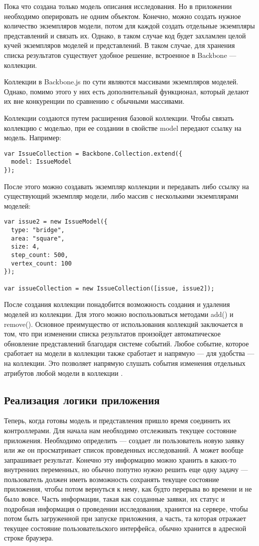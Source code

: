 Пока что создана только модель описания исследования. Но в приложении необходимо оперировать не одним объектом. Конечно, можно создать нужное количество экземпляров модели, потом для каждой создать отдельные экземпляры представлений и связать их. Однако, в таком случае код будет захламлен целой кучей экземпляров моделей и представлений. В таком случае, для хранения списка результатов существует удобное решение, встроенное в Backbone --- коллекции.

Коллекции в Backbone.js по сути являются массивами экземпляров моделей. Однако, помимо этого у них есть дополнительный функционал, который делают их вне конкуренции по сравнению с обычными массивами.

Коллекции создаются путем расширения базовой коллекции. Чтобы связать коллекцию с моделью, при ее создании в свойстве model передают ссылку на модель. Например:
\begin{lstlisting}
var IssueCollection = Backbone.Collection.extend({
  model: IssueModel
});
\end{lstlisting}
После этого можно создавать экземпляр коллекции и передавать либо ссылку на существующий экземпляр модели, либо массив с несколькими экземплярами моделей:
\begin{lstlisting}
var issue2 = new IssueModel({
  type: "bridge",
  area: "square",
  size: 4,
  step_count: 500,
  vertex_count: 100
});

var issueCollection = new IssueCollection([issue, issue2]);
\end{lstlisting}
После создания коллекции понадобится возможность создания и удаления моделей из коллекции. Для этого можно воспользоваться методами add() и remove(). Основное преимущество от использования коллекций заключается в том, что при изменении списка результатов произойдет автоматическое обновление представлений благодаря системе событий. Любое событие, которое сработает на модели в коллекции также сработает и напрямую --- для удобства --- на коллекции. Это позволяет напрямую слушать события изменения отдельных атрибутов любой модели в коллекции \cite{backbone}.

\subsection{Реализация логики приложения}

Теперь, когда готовы модель и представления пришло время соединить их контроллерами. Для начала нам необходимо отслеживать текущее состояние приложения. Необходимо определить --- создает ли пользователь новую заявку или же он просматривает список проведенных исследований. А может вообще запрашивает результат.  Конечно эту информацию можно хранить в каких-то внутренних переменных, но обычно попутно нужно решить еще одну задачу — пользователь должен иметь возможность сохранять текущее состояние приложения, чтобы потом вернуться к нему, как будто перерыва во времени и не было вовсе. Часть информации, такая как созданные заявки, их статус и подробная информация о проведении исследования, хранится на сервере, чтобы потом быть загруженной при запуске приложения, а часть, та которая отражает текущее состояние пользовательского интерфейса, обычно хранится в адресной строке браузера. 

